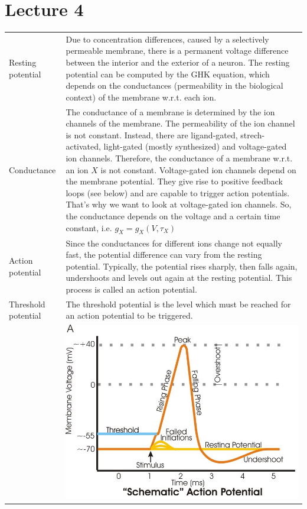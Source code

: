 \section{Lecture 4}
\begin{tabular}{p{4cm}p{15cm}}
Resting potential	& Due to concentration differences, caused by a selectively permeable membrane, there is a permanent voltage difference between the interior and the exterior of a neuron. The resting potential can be computed by the GHK equation, which depends on the conductances (permeability in the biological context) of the membrane w.r.t. each ion.\\
Conductance		& The conductance of a membrane is determined by the ion channels of the membrane. The permeability of the ion channel is not constant. Instead, there are ligand-gated, strech-activated, light-gated (mostly synthesized) and voltage-gated ion channels. Therefore, the conductance of a membrane w.r.t. an ion $X$ is not constant. Voltage-gated ion channels depend on the membrane potential. They give rise to positive feedback loops (see below) and are capable to trigger action potentials. That's why we want to look at voltage-gated ion channels. So, the conductance depends on the voltage and a certain time constant, i.e. $g_X = g_X(V,\tau_X)$\\
Action potential	& Since the conductances for different ions change not equally fast, the potential difference can vary from the resting potential. Typically, the potential rises sharply, then falls again, undershoots and levels out again at the resting potential. This process is called an action potential.\\
Threshold potential	& The threshold potential is the level which must be reached for an action potential to be triggered.\\
			& \includegraphics[width=12cm]{neuroinf_actionpotential.png}\\
\end{tabular}
